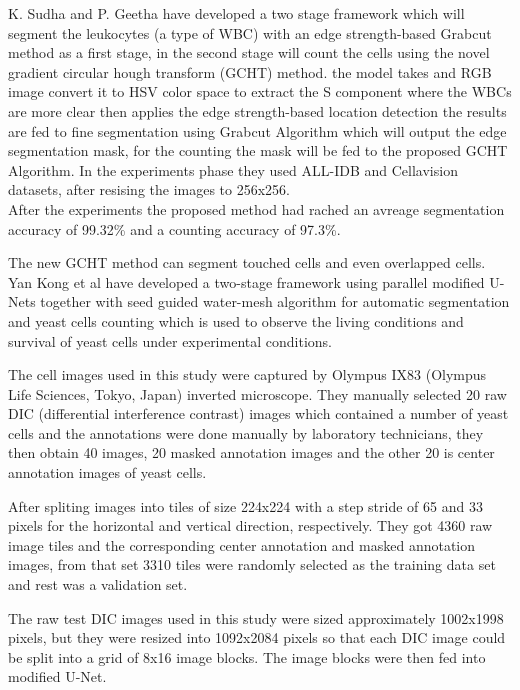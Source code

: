 K. Sudha and P. Geetha \textsuperscript{\cite{SUDHA2020639}} have developed a two stage framework which will segment the leukocytes (a type of WBC) with an edge strength-based Grabcut method as a first stage, in the second stage will count the cells using the novel gradient circular hough transform (GCHT) method. the model takes and RGB image convert it to HSV color space to extract the S component where the WBCs are more clear then applies the edge strength-based location detection the results are fed to fine segmentation using Grabcut Algorithm which will output the edge segmentation mask, for the counting the mask will be fed to the proposed GCHT Algorithm. In the experiments phase they used ALL-IDB \textsuperscript{\cite{labati2011all}} and Cellavision \textsuperscript{\cite{Zheng2018}} datasets, after resising the images to 256x256.\\
After the experiments the proposed method had rached an avreage segmentation accuracy of 99.32\% and a counting accuracy of 97.3\%.

\newpage

The new GCHT method can segment touched cells and even overlapped cells.\\

Yan Kong et al \textsuperscript{\cite{Kong:20}} have developed a two-stage framework using parallel modified U-Nets together with seed guided water-mesh algorithm for automatic segmentation and yeast cells counting which is used to observe the living conditions and survival of yeast cells under experimental conditions.

The cell images used in this study were captured by Olympus IX83 (Olympus Life Sciences, Tokyo, Japan) inverted microscope. They manually selected 20 raw DIC (differential interference contrast) images which contained a number of yeast cells and the annotations were done manually by laboratory technicians, they then obtain 40 images, 20 masked annotation images and the other 20 is center annotation images of yeast cells.

After spliting images into tiles of size 224x224 with a step stride of 65 and 33 pixels for the horizontal and vertical direction, respectively. They got 4360 raw image tiles and the corresponding center annotation and masked annotation images, from that set 3310 tiles were randomly selected as the training data set and rest was a validation set.

The raw test DIC images used in this study were sized approximately 1002x1998 pixels, but they were resized into 1092x2084 pixels so that each DIC image could be split into a grid of 8x16 image blocks. The image blocks were then fed into modified U-Net.

